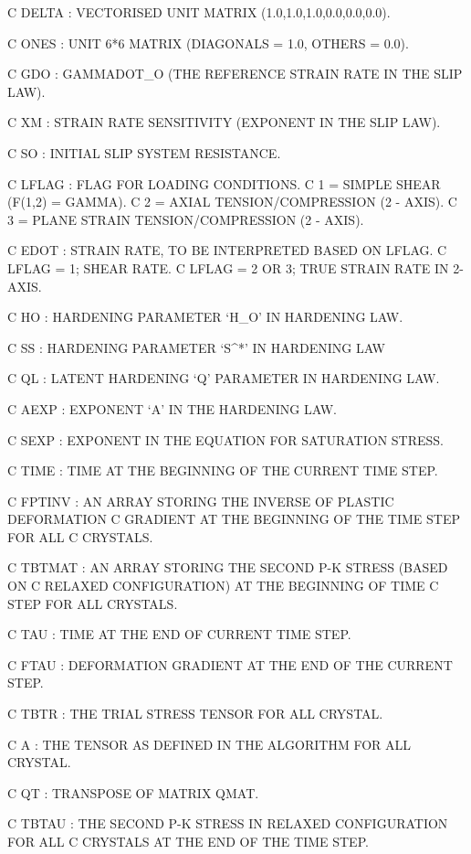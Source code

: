 C   DELTA       : VECTORISED UNIT MATRIX (1.0,1.0,1.0,0.0,0.0,0.0).

C   ONES        : UNIT 6*6 MATRIX (DIAGONALS = 1.0, OTHERS = 0.0).

C   GDO         : GAMMADOT_O (THE REFERENCE STRAIN RATE IN THE SLIP LAW).

C   XM          : STRAIN RATE SENSITIVITY (EXPONENT IN THE SLIP LAW).

C   SO          : INITIAL SLIP SYSTEM RESISTANCE.

C   LFLAG       : FLAG FOR LOADING CONDITIONS.
C                   1 = SIMPLE SHEAR (F(1,2) = GAMMA).
C                   2 = AXIAL TENSION/COMPRESSION (2 - AXIS).
C                   3 = PLANE STRAIN TENSION/COMPRESSION (2 - AXIS). 

C   EDOT        : STRAIN RATE, TO BE INTERPRETED BASED ON LFLAG.
C                   LFLAG = 1; SHEAR RATE.
C                   LFLAG = 2 OR 3; TRUE STRAIN RATE IN 2-AXIS.

C   HO          : HARDENING PARAMETER `H_O' IN HARDENING LAW. 

C   SS          : HARDENING PARAMETER `S^*' IN HARDENING LAW 

C   QL          : LATENT HARDENING `Q' PARAMETER IN HARDENING LAW.

C   AEXP        : EXPONENT `A' IN THE HARDENING LAW.

C   SEXP        : EXPONENT IN THE EQUATION FOR SATURATION STRESS.   

C   TIME        : TIME AT THE BEGINNING OF THE CURRENT TIME STEP.

C   FPTINV      : AN ARRAY STORING THE INVERSE OF PLASTIC DEFORMATION 
C                 GRADIENT AT THE BEGINNING OF THE TIME STEP FOR ALL 
C                 CRYSTALS.

C   TBTMAT      : AN ARRAY STORING THE SECOND P-K STRESS (BASED ON
C                 RELAXED CONFIGURATION) AT THE BEGINNING OF TIME 
C                 STEP FOR ALL CRYSTALS.
 
C   TAU         : TIME AT THE END OF CURRENT TIME STEP.

C   FTAU        : DEFORMATION GRADIENT AT THE END OF THE CURRENT STEP.

C   TBTR        : THE TRIAL STRESS TENSOR FOR ALL CRYSTAL.

C   A           : THE TENSOR AS DEFINED IN THE ALGORITHM FOR ALL CRYSTAL.

C   QT          : TRANSPOSE OF MATRIX QMAT.

C   TBTAU       : THE SECOND P-K STRESS IN RELAXED CONFIGURATION FOR ALL 
C                 CRYSTALS AT THE END OF THE TIME STEP.


